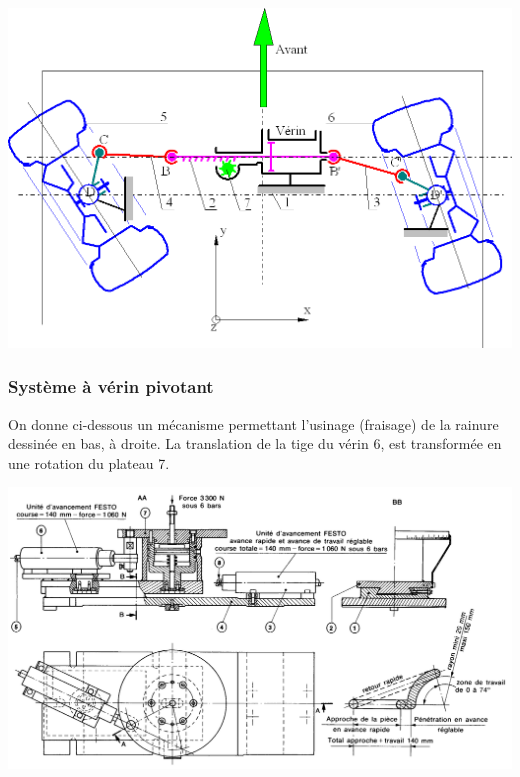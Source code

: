 \documentclass[11pt,oneside]{article}
\begin{document}
\begin{center}
\includegraphics[width=.8\textwidth]{png/fig_126}
\end{center}

\subsubsection{Système à vérin pivotant}
On donne ci-dessous un mécanisme permettant l’usinage (fraisage) de la rainure dessinée en bas, à droite.
La translation de la tige du vérin 6, est transformée en une rotation du plateau 7.

\begin{center}
\includegraphics[width=.9\textwidth]{png/fig_127}
\end{center}
\end{document}
